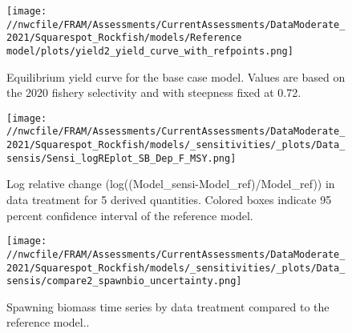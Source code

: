 \documentclass[11pt,
  english,
  a4paper,
]{article}
\begin{document}
\tagmcend\tagstructend


\begin{figure}
\centering
\texttt{[image: //nwcfile/FRAM/Assessments/CurrentAssessments/DataModerate\_2021/Squarespot\_Rockfish/models/Reference model/plots/yield2\_yield\_curve\_with\_refpoints.png]}
\caption{Equilibrium yield curve for the base case model. Values are based on the 2020 fishery selectivity and with steepness fixed at 0.72.\label{fig:yield}}
\end{figure}

\tagmcend\tagstructend


\begin{figure}
\centering
\texttt{[image: //nwcfile/FRAM/Assessments/CurrentAssessments/DataModerate\_2021/Squarespot\_Rockfish/models/\_sensitivities/\_plots/Data\_sensis/Sensi\_logREplot\_SB\_Dep\_F\_MSY.png]}
\caption{Log relative change (log((Model\_sensi-Model\_ref)/Model\_ref)) in data treatment for 5 derived quantities. Colored boxes indicate 95 percent confidence interval of the reference model.\label{fig:sensi-data-RE}}
\end{figure}

\tagmcend\tagstructend


\begin{figure}
\centering
\texttt{[image: //nwcfile/FRAM/Assessments/CurrentAssessments/DataModerate\_2021/Squarespot\_Rockfish/models/\_sensitivities/\_plots/Data\_sensis/compare2\_spawnbio\_uncertainty.png]}
\caption{Spawning biomass time series by data treatment compared to the reference model..\label{fig:sensi-data-ssb}}
\end{figure}

\tagmcend\tagstructend

\end{document}
